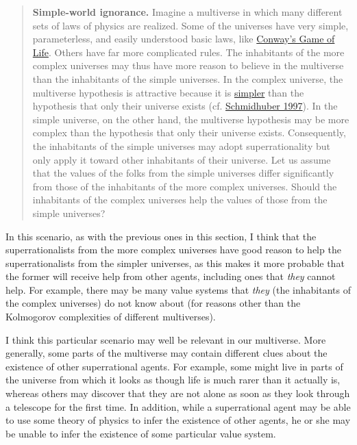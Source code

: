 \begin{quote}
\textbf{Simple-world ignorance.} Imagine a multiverse in which many
different sets of laws of physics are realized. Some of the universes
have very simple, parameterless, and easily understood basic laws, like
\href{https://en.wikipedia.org/wiki/Conway\%27s_Game_of_Life}{Conway's
Game of Life}. Others have far more complicated rules. The inhabitants
of the more complex universes may thus have more reason to believe in
the multiverse than the inhabitants of the simple universes. In the
complex universe, the multiverse hypothesis is attractive because it is
\href{http://lesswrong.com/lw/jp/occams_razor/}{simpler} than the
hypothesis that only their universe exists (cf.
\href{ftp://ftp.idsia.ch/pub/juergen/everything.pdf}{Schmidhuber
1997}). In the simple universe, on the other hand, the multiverse
hypothesis may be more complex than the hypothesis that only their
universe exists. Consequently, the inhabitants of the simple universes
may adopt superrationality but only apply it toward other inhabitants of
their universe. Let us assume that the values of the folks from the
simple universes differ significantly from those of the inhabitants of
the more complex universes. Should the inhabitants of the complex
universes help the values of those from the simple universes?
\end{quote}

In this scenario, as with the previous ones in this section, I think
that the superrationalists from the more complex universes have good
reason to help the superrationalists from the simpler universes, as this
makes it more probable that the former will receive help from other
agents, including ones that \emph{they} cannot help. For example, there
may be many value systems that \emph{they} (the inhabitants of the
complex universes) do not know about (for reasons other than the
Kolmogorov complexities of different multiverses).

I think this particular scenario may well be relevant in our multiverse.
More generally, some parts of the multiverse may contain different clues
about the existence of other superrational agents. For example, some
might live in parts of the universe from which it looks as though life
is much rarer than it actually is, whereas others may discover that they
are not alone as soon as they look through a telescope for the first
time. In addition, while a superrational agent may be able to use some
theory of physics to infer the existence of other agents, he or she may
be unable to infer the existence of some particular value system.

